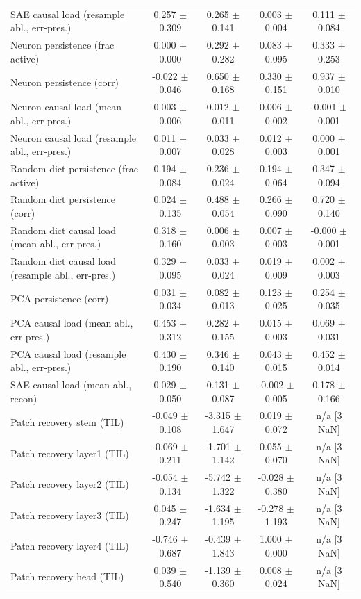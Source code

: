 \begin{table}[t]
\begin{tabular}{lcccc}
SAE causal load (resample abl., err-pres.) & 0.257 $\pm$ 0.309 & 0.265 $\pm$ 0.141 & 0.003 $\pm$ 0.004 & 0.111 $\pm$ 0.084 \\
Neuron persistence (frac active) & 0.000 $\pm$ 0.000 & 0.292 $\pm$ 0.282 & 0.083 $\pm$ 0.095 & 0.333 $\pm$ 0.253 \\
Neuron persistence (corr) & -0.022 $\pm$ 0.046 & 0.650 $\pm$ 0.168 & 0.330 $\pm$ 0.151 & 0.937 $\pm$ 0.010 \\
Neuron causal load (mean abl., err-pres.) & 0.003 $\pm$ 0.006 & 0.012 $\pm$ 0.011 & 0.006 $\pm$ 0.002 & -0.001 $\pm$ 0.001 \\
Neuron causal load (resample abl., err-pres.) & 0.011 $\pm$ 0.007 & 0.033 $\pm$ 0.028 & 0.012 $\pm$ 0.003 & 0.000 $\pm$ 0.001 \\
Random dict persistence (frac active) & 0.194 $\pm$ 0.084 & 0.236 $\pm$ 0.024 & 0.194 $\pm$ 0.064 & 0.347 $\pm$ 0.094 \\
Random dict persistence (corr) & 0.024 $\pm$ 0.135 & 0.488 $\pm$ 0.054 & 0.266 $\pm$ 0.090 & 0.720 $\pm$ 0.140 \\
Random dict causal load (mean abl., err-pres.) & 0.318 $\pm$ 0.160 & 0.006 $\pm$ 0.003 & 0.007 $\pm$ 0.003 & -0.000 $\pm$ 0.001 \\
Random dict causal load (resample abl., err-pres.) & 0.329 $\pm$ 0.095 & 0.033 $\pm$ 0.024 & 0.019 $\pm$ 0.009 & 0.002 $\pm$ 0.003 \\
PCA persistence (corr) & 0.031 $\pm$ 0.034 & 0.082 $\pm$ 0.013 & 0.123 $\pm$ 0.025 & 0.254 $\pm$ 0.035 \\
PCA causal load (mean abl., err-pres.) & 0.453 $\pm$ 0.312 & 0.282 $\pm$ 0.155 & 0.015 $\pm$ 0.003 & 0.069 $\pm$ 0.031 \\
PCA causal load (resample abl., err-pres.) & 0.430 $\pm$ 0.190 & 0.346 $\pm$ 0.140 & 0.043 $\pm$ 0.015 & 0.452 $\pm$ 0.014 \\
SAE causal load (mean abl., recon) & 0.029 $\pm$ 0.050 & 0.131 $\pm$ 0.087 & -0.002 $\pm$ 0.005 & 0.178 $\pm$ 0.166 \\
Patch recovery stem (TIL) & -0.049 $\pm$ 0.108 & -3.315 $\pm$ 1.647 & 0.019 $\pm$ 0.072 & n/a [3 NaN] \\
Patch recovery layer1 (TIL) & -0.069 $\pm$ 0.211 & -1.701 $\pm$ 1.142 & 0.055 $\pm$ 0.070 & n/a [3 NaN] \\
Patch recovery layer2 (TIL) & -0.054 $\pm$ 0.134 & -5.742 $\pm$ 1.322 & -0.028 $\pm$ 0.380 & n/a [3 NaN] \\
Patch recovery layer3 (TIL) & 0.045 $\pm$ 0.247 & -1.634 $\pm$ 1.195 & -0.278 $\pm$ 1.193 & n/a [3 NaN] \\
Patch recovery layer4 (TIL) & -0.746 $\pm$ 0.687 & -0.439 $\pm$ 1.843 & 1.000 $\pm$ 0.000 & n/a [3 NaN] \\
Patch recovery head (TIL) & 0.039 $\pm$ 0.540 & -1.139 $\pm$ 0.360 & 0.008 $\pm$ 0.024 & n/a [3 NaN] \\
\bottomrule
\end{tabular}
\end{table}
